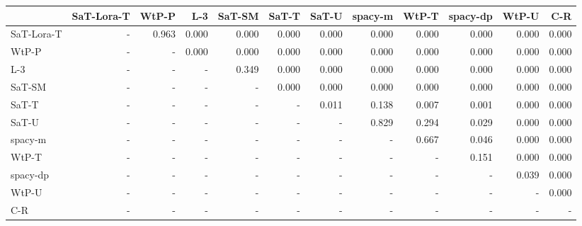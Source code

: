 \begin{tabular}{lrrrrrrrrrrr}
\toprule
 & SaT-Lora-T & WtP-P & L-3 & SaT-SM & SaT-T & SaT-U & spacy-m & WtP-T & spacy-dp & WtP-U & C-R \\
\midrule
SaT-Lora-T & - & 0.963 & 0.000 & 0.000 & 0.000 & 0.000 & 0.000 & 0.000 & 0.000 & 0.000 & 0.000 \\
WtP-P & - & - & 0.000 & 0.000 & 0.000 & 0.000 & 0.000 & 0.000 & 0.000 & 0.000 & 0.000 \\
L-3 & - & - & - & 0.349 & 0.000 & 0.000 & 0.000 & 0.000 & 0.000 & 0.000 & 0.000 \\
SaT-SM & - & - & - & - & 0.000 & 0.000 & 0.000 & 0.000 & 0.000 & 0.000 & 0.000 \\
SaT-T & - & - & - & - & - & 0.011 & 0.138 & 0.007 & 0.001 & 0.000 & 0.000 \\
SaT-U & - & - & - & - & - & - & 0.829 & 0.294 & 0.029 & 0.000 & 0.000 \\
spacy-m & - & - & - & - & - & - & - & 0.667 & 0.046 & 0.000 & 0.000 \\
WtP-T & - & - & - & - & - & - & - & - & 0.151 & 0.000 & 0.000 \\
spacy-dp & - & - & - & - & - & - & - & - & - & 0.039 & 0.000 \\
WtP-U & - & - & - & - & - & - & - & - & - & - & 0.000 \\
C-R & - & - & - & - & - & - & - & - & - & - & - \\
\bottomrule
\end{tabular}

